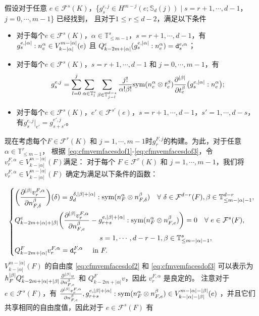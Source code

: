 假设对于任意 $e\in\mathcal F^s(K)$，\{$g_{s}^{e,j}\in H^{m-j}(e;\mathbb S_d(j))
\mid s=r+1,\cdots,
d-1$，$j=0,\cdots,m-1$\} 已经找到，
且对于$1\leq r\leq d-2$，满足以下条件
\begin{itemize}
    \item 对于每个$e\in\mathcal F^s(K)$，$\alpha\in \mathbb{T}^s_{\leq m-1}$，$s=r+1,\cdots, d-1$，有$g_{s}^{e,|\alpha|}:n_e^{\alpha}\in V_{k-|\alpha|}^{m-|\alpha|}(e)$ 且 $Q_{k-2m+|\alpha|}^e(g_{s}^{e,|\alpha|}:n_e^{\alpha})=\textnormal{\texttt{d}}_{s}^{e,\alpha}$；
\item 对于每个$e\in\mathcal F^s(K)$，$s=r+1,\cdots, d-1$ 和 $j=0,\cdots,m-1$，有
$$
g_{s}^{e,j} = \sum_{l=0}^j\sum_{\alpha \in \mathbb{T}_{l}^s}\sum_{ \beta\in
\mathbb{T}_{j-l}^{d-s}}
\frac{j!}{\alpha!\beta!}\mathrm{sym}(n_e^{\alpha}\otimes
t_{e}^{\beta})\frac{\partial^{|\beta|}}{\partial
t_{e}^{\beta}}\big(g_{s}^{e,|\alpha|}:n_e^{\alpha}\big);
$$
\item 对于每个$e\in\mathcal F^s(K)$，$e'\in\mathcal F^{s'}(e)$，$s=r+1,\cdots, d-1$，$s'=1,\cdots, d-s$，有$g_{s}^{e,j}|_{e'}=g_{s+s'}^{e',j}$。
\end{itemize}
现在考虑每个$F\in\mathcal F^{r}(K)$ 和
$j=1,\cdots,m-1$时$g_{r}^{F,j}$的构建。为此，对于任意$\alpha\in \mathbb{T}^r_{\leq m-1}$，
根据 \eqref{eq:cfmvemfacesdof1}-\eqref{eq:cfmvemfacesdof3}，令$v_{r}^{F,\alpha}\in V_{k-|\alpha|}^{m-|\alpha|}(F)$满足：
对于每个 \( F\in\mathcal{F}^{r}(K) \) 和 \( j=1,\cdots,m-1 \)，我们将 \( v_{r}^{F,\alpha}\in V_{k-|\alpha|}^{m-|\alpha|}(F) \) 确定为满足以下条件的函数：

$$
\left\{
\begin{aligned}
&\bigg(\frac{\partial^{|\beta|}v_{r}^{F,\alpha}}{\partial n_{F,\delta}^{\beta}}\bigg)(\delta)=g_{d}^{\delta,
|\beta|+|\alpha|}:\mathrm{sym}(n_F^{\alpha}\otimes n_{F,\delta}^{\beta})\quad
\forall~\delta\in\mathcal F^{d-r}(F), \beta\in \mathbb{T}^{d-r}_{\leq
m-|\alpha|-1}, \\
&Q_{k-2m+|\alpha|+|\beta|}^e\bigg(\frac{\partial^{|\beta|}v_{r}^{F,\alpha}}{\partial n_{F,e}^{\beta}}-g_{r+s}^{e, |\beta|+|\alpha|}:\mathrm{sym}(n_F^{\alpha}\otimes n_{F,e}^{\beta})\bigg) = 0\quad \forall~e\in\mathcal F^{s}(F),  \\
&\qquad\qquad\qquad\qquad\qquad\qquad s=1,\cdots,d-r-1,\beta\in
\mathbb{T}^{s}_{\leq m-|\alpha|-1}, \\
&Q_{k-2m+|\alpha|}^Fv_{r}^{F,\alpha}=\textnormal{\texttt{d}}_{r}^{F,\alpha}\quad\text{ in } F.
\end{aligned}
\right.
$$
\( V_{k-|\alpha|}^{m-|\alpha|}(F) \) 的自由度 \eqref{eq:cfmvemfacesdof2} 和
\eqref{eq:cfmvemfacesdof3} 可以表示为 \(
h_F^{|\beta|}Q_{k-2m+|\alpha|+|\beta|}^e\frac{\partial^{|\beta|}v}{\partial
n_{F,e}^{\beta}} \) 和 \( Q_{k-2m+|\alpha|}^Fv \)，因此 \( v_{r}^{F,\alpha} \)
是良定的。
注意对于 \( e\in\mathcal F^{s}(F) \)，有 \(
\frac{\partial^{|\beta|}v_{r}^{F,\alpha}}{\partial n_{F,e}^{\beta}},
g_{r+s}^{e,
|\beta|+|\alpha|}:\mathrm{sym}(n_F^{\alpha}\otimes n_{F,e}^{\beta}) \in
V_{k-|\alpha|-|\beta|}^{m-|\alpha|-|\beta|}(e) \)
，并且它们共享相同的自由度值，因此对于 \( e\in\mathcal F^{s}(F) \) 有

